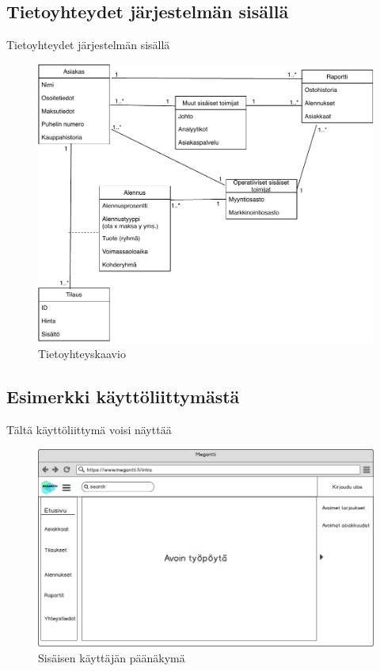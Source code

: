 \documentclass{beamer}
\begin{document}
\subsection{Tietoyhteydet järjestelmän sisällä}

\begin{frame}{Tietoyhteydet järjestelmän sisällä}


	\begin{figure}[h]
		\includegraphics[width=\textwidth]{../harjoitustyo/images/Tietoyhteyskaavio.pdf}
		\caption{Tietoyhteyskaavio}
	\end{figure}

\end{frame}


\subsection{Esimerkki käyttöliittymästä}

\begin{frame}{Tältä käyttöliittymä voisi näyttää}

	\begin{figure}[h]
		\includegraphics[width=\textwidth]{../harjoitustyo/images/gui/sisainen_paa.png}
		\caption{Sisäisen käyttäjän päänäkymä}
	\end{figure}

\end{frame}
\end{document}
